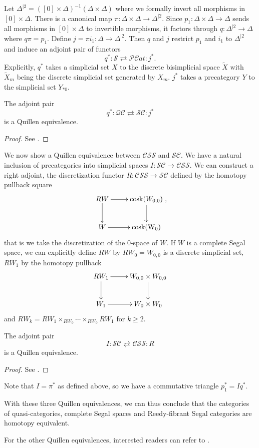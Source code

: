 \begin{refsection}
Let $\Delta^{|2}=([0]\times\Delta)^{-1}(\Delta\times\Delta)$ where we formally invert all morphisms in $[0]\times\Delta$. There is a canonical map $\pi:\Delta\times\Delta\to\Delta^{|2}$. Since $p_1:\Delta\times\Delta\to\Delta$ sends all morphisms in $[0]\times\Delta$ to invertible morphisms, it factors through $q:\Delta^{|2}\to\Delta$ where $q\pi=p_1$. Define $j=\pi i_1:\Delta\to\Delta^{|2}$. Then $q$ and $j$ restrict $p_1$ and $i_1$ to $\Delta^{|2}$ and induce an adjoint pair of functors
$$q^*:\mathcal S\rightleftarrows\mathcal{PC}at:j^*.$$
Explicitly, $q^*$ takes a simplicial set $X$ to the discrete bisimplicial space $\tilde X$ with $\tilde X_m$ being the discrete simplicial set generated by $X_m$. $j^*$ takes a precategory $Y$ to the simplicial set $Y_{*0}$.

\begin{thm}
The adjoint pair
$$q^*:\mathcal{QC}\rightleftarrows\mathcal{SC}:j^*$$
is a Quillen equivalence.
\end{thm}
\begin{proof}
See \cite{jt}.
\end{proof}

We now show a Quillen equivalence between $\mathcal{CSS}$ and $\mathcal{SC}$. We have a natural inclusion of precategories into simplicial spaces $I:\mathcal{SC}\to\mathcal{CSS}$. We can construct a right adjoint, the discretization functor $R:\mathcal{CSS}\to\mathcal{SC}$ defined by the homotopy pullback square
$$\xymatrix{RW\ar[r]\ar[d]&\mathrm{cosk}(W_{0,0})\ar[d]\\W\ar[r]&\mathrm{cosk(W_0)}},$$
that is we take the discretization of the 0-space of $W$. If $W$ is a complete Segal space, we can explicitly define $RW$ by $RW_0=W_{0,0}$ is a discrete simplicial set, $RW_1$ by the homotopy pullback
$$\xymatrix{RW_1\ar[r]\ar[d]&W_{0,0}\times W_{0,0}\ar[d]\\W_1\ar[r]&W_0\times W_0}$$
and $RW_k=RW_1\times_{RW_0}\cdots\times_{RW_0}RW_1$ for $k\ge2$.

\begin{thm}
The adjoint pair
$$I:\mathcal{SC}\rightleftarrows\mathcal{CSS}:R$$
is a Quillen equivalence.
\end{thm}

\begin{proof}
See \cite{bergner3}.
\end{proof}

Note that $I=\pi^*$ as defined above, so we have a commutative triangle $p_1^*=Iq^*$.

With these three Quillen equivalences, we can thus conclude that the categories of quasi-categories, complete Segal spaces and Reedy-fibrant Segal categories are homotopy equivalent.

For the other Quillen equivalences, interested readers can refer to \cite{hs}.

\printbibliography[heading = local]

\end{refsection}
